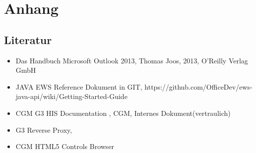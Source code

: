 
\chapter{Anhang}
\section{Literatur}
\begin{itemize}[label={}]
\setlength\itemsep{1em}
	\item Das Handbuch Microsoft Outlook 2013, Thomas Joos, 2013, O’Reilly Verlag GmbH
  \item JAVA EWS Reference Dokument in GIT, https://github.com/OfficeDev/ews-java-api/wiki/Getting-Started-Guide
  \item CGM G3 HIS Documentation , CGM, Internes Dokument(vertraulich)
	\item G3 Reverse Proxy, 
	\item CGM HTML5 Controls Browser
\end{itemize}
